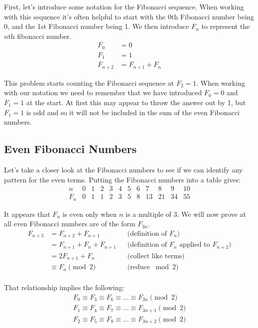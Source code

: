 \documentclass{article}
\begin{document}
First, let's introduce some notation for the Fibonacci sequence. When working
with this sequence it's often helpful to start with the 0th Fibonacci number
being 0, and the 1st Fibonacci number being 1. We then introduce \(F_n\) to
represent the \(n\)th fibonacci number.
\[\begin{aligned}
    F_0 &= 0 \\
    F_1 &= 1 \\
    F_{n+2} &= F_{n+1} + F_n
\end{aligned}\]

This problem starts counting the Fibonacci sequence at \(F_2=1\). When working
with our notation we need to remember that we have introduced \(F_0=0\) and
\(F_1=1\) at the start. At first this may appear to throw the answer out by 1,
but \(F_1=1\) is odd and so it will not be included in the sum of the even
Fibonacci numbers.

\subsection*{Even Fibonacci Numbers}
Let's take a closer look at the Fibonacci numbers to see if we can identify any
pattern for the even terms. Putting the Fibonacci numbers into a table gives:
\[\begin{array}{r|ccccccccccc}
    n & 0 & 1 & 2 & 3 & 4 & 5 & 6 & 7 & 8 & 9 & 10 \\
    \hline
    F_n & 0 & 1 & 1 & 2 & 3 & 5 & 8 & 13 & 21 & 34 & 55
\end{array}\]

It appears that \(F_n\) is even only when \(n\) is a multiple of 3. We will now
prove at all even Fibonacci numbers are of the form \(F_{3n}\).
\[\begin{aligned}
    F_{n+3} &= F_{n+2} + F_{n+1}
        && \text{(definition of \(F_n\))} \\
    &= F_{n+1} + F_n + F_{n+1}
        && \text{(definition of \(F_n\) applied to \(F_{n+2}\))} \\
    &= 2F_{n+1} + F_n
        && \text{(collect like terms)} \\
    &\equiv F_n \pmod 2
        && \text{(reduce \(\bmod 2\))} \\
\end{aligned}\]

That relationship implies the following:
\[\begin{aligned}
    F_0 \equiv F_3 \equiv F_6 \equiv \dots\equiv F_{3n} \pmod 2 \\
    F_1 \equiv F_4 \equiv F_7 \equiv \dots \equiv F_{3n+1} \pmod 2 \\
    F_2 \equiv F_5 \equiv F_8 \equiv \dots \equiv F_{3n+2} \pmod 2
\end{aligned}\]
\end{document}
